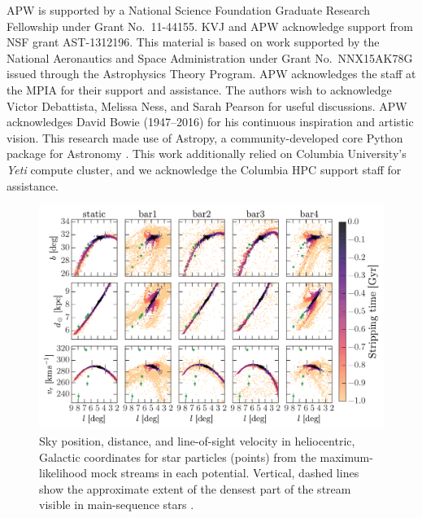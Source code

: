 \documentclass[letterpaper,12pt,preprint]{aastex}
\begin{document}
\acknowledgements
APW is supported by a National Science Foundation Graduate Research Fellowship under Grant No.\ 11-44155.
KVJ and APW acknowledge support from NSF grant AST-1312196.
This material is based on work supported by the National Aeronautics and Space Administration under Grant No.\, NNX15AK78G issued through the Astrophysics Theory Program.
APW acknowledges the staff at the MPIA for their support and assistance.
The authors wish to acknowledge Victor Debattista, Melissa Ness, and Sarah Pearson for useful discussions.
APW acknowledges David Bowie (1947--2016) for his continuous inspiration and artistic vision.
This research made use of Astropy, a community-developed core Python package for Astronomy \citep{astropy13}.
This work additionally relied on Columbia University's \emph{Yeti} compute cluster, and we acknowledge the Columbia HPC support staff for assistance. \\

\begin{landscape}
\begin{figure}[p]
\begin{center}
\includegraphics[width=1.2\textwidth]{figures/mockstream0}
\caption{ Sky position, distance, and line-of-sight velocity in heliocentric, Galactic coordinates for star particles (points) from the maximum-likelihood mock streams in each potential. Vertical, dashed lines show the approximate extent of the densest part of the stream visible in main-sequence stars \citep[the segment originally detected in ][]{bernard14}. }
\label{fig:mockstream0}
\end{center}
\end{figure}
\end{landscape}
\end{document}
